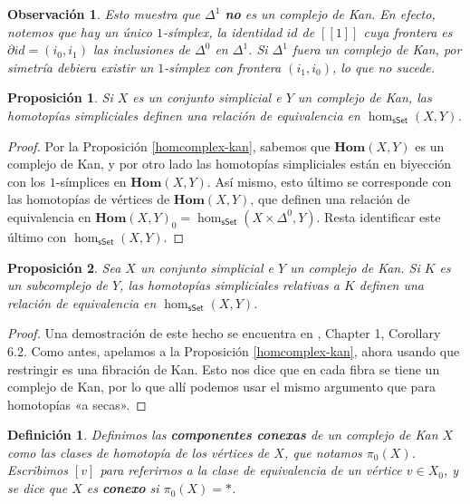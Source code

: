 \documentclass[11pt]{report}
\theoremstyle{colored}
\newtheorem{definition}{Definición}[section]
\newtheorem{proposition}{Proposición}[section]
\newtheorem{remark}{Observación}[section]
\newcommand{\nat}[1]{[\![#1]\!]}
\newcommand{\cat}[1]{\mathsf{#1}}
\renewcommand{\ss}[1]{\Delta^{#1}}
\newcommand{\homcomplex}{\mathbf{Hom}}
\newcommand{\guill}[1]{«#1»}
\begin{document}
\begin{remark} Esto muestra que $\ss{1}$ \textbf{no} es un complejo de Kan. En efecto, notemos que hay un único $1$-símplex, la identidad $id$ de $\nat{1}$ cuya frontera es $\partial id = (i_0,i_1)$ las inclusiones de $\ss{0}$ en $\ss{1}$. Si $\ss{1}$ fuera un complejo de Kan, por simetría debiera existir un $1$-símplex con frontera $(i_1,i_0)$, lo que no sucede.
\end{remark}

\begin{proposition} Si $X$ es un conjunto simplicial e $Y$ un complejo de Kan, las homotopías simpliciales definen una relación de equivalencia en $\hom_{\cat{sSet}}(X,Y)$.
\end{proposition}
\begin{proof} Por la Proposición \ref{homcomplex-kan}, sabemos que $\homcomplex(X,Y)$ es un complejo de Kan, y por otro lado las homotopías simpliciales están en biyección con los $1$-símplices en $\homcomplex(X,Y)$. Así mismo, esto último se corresponde con las homotopías de vértices de $\homcomplex(X,Y)$, que definen una relación de equivalencia en $\homcomplex(X,Y)_0 = \hom_{\cat{sSet}}(X \times \ss{0},Y)$. Resta identificar este último con $\hom_{\cat{sSet}}(X,Y)$.
\end{proof}

\begin{proposition} Sea $X$ un conjunto simplicial e $Y$ un complejo de Kan. Si $K$ es un subcomplejo de $Y$, las homotopías simpliciales relativas a $K$ definen una relación de equivalencia en $\hom_{\cat{sSet}}(X,Y)$.
\end{proposition}
\begin{proof} Una demostración de este hecho se encuentra en \cite{GJ}, Chapter 1, Corollary 6.2. Como antes, apelamos a la Proposición \ref{homcomplex-kan}, ahora usando que restringir es una fibración de Kan. Esto nos dice que en cada fibra se tiene un complejo de Kan, por lo que allí podemos usar el mismo argumento que para homotopías \guill{a secas}.
\end{proof}

\begin{definition} Definimos las \textbf{componentes conexas} de un complejo de Kan $X$ como las clases de homotopía de los vértices de $X$, que notamos $\pi_0(X)$. Escribimos $[v]$ para referirnos a la clase de equivalencia de un vértice $v \in X_0$, y se dice que $X$ es \textbf{conexo} si $\pi_0(X) = \ast$.
\end{definition}
\end{document}
